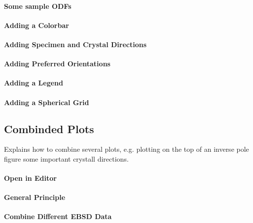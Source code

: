 \documentclass{article}
\begin{document}
			\paragraph{Some sample ODFs}
		
			\paragraph{Adding a Colorbar}
		
			\paragraph{Adding Specimen and Crystal Directions}
		
			\paragraph{Adding Preferred Orientations}
		
			\paragraph{Adding a Legend}
		
			\paragraph{Adding a Spherical Grid}
		
		\subsection{Combinded Plots}

		
                     \begin{par}
Explains how to combine several plots, e.g. plotting on the top of an inverse pole figure some important crystall directions.
\end{par} \vspace{1em}

                  
			\paragraph{Open in Editor}
		
			\paragraph{General Principle}
		
			\paragraph{Combine Different EBSD Data}
		
\end{document}
